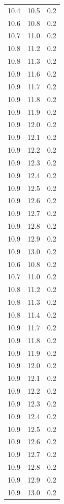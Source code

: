 \documentclass[usenatbib]{mn2e}
\begin{document}
\begin{table}
\begin{center}
\begin{tabular}{ccc}
10.4 & 10.5 & 0.2\\
10.6 & 10.8 & 0.2\\
10.7 & 11.0 & 0.2\\
10.8 & 11.2 & 0.2\\
10.8 & 11.3 & 0.2\\
10.9 & 11.6 & 0.2\\
10.9 & 11.7 & 0.2\\
10.9 & 11.8 & 0.2\\
10.9 & 11.9 & 0.2\\
10.9 & 12.0 & 0.2\\
10.9 & 12.1 & 0.2\\
10.9 & 12.2 & 0.2\\
10.9 & 12.3 & 0.2\\
10.9 & 12.4 & 0.2\\
10.9 & 12.5 & 0.2\\
10.9 & 12.6 & 0.2\\
10.9 & 12.7 & 0.2\\
10.9 & 12.8 & 0.2\\
10.9 & 12.9 & 0.2\\
10.9 & 13.0 & 0.2\\
10.6 & 10.8 & 0.2\\
10.7 & 11.0 & 0.2\\
10.8 & 11.2 & 0.2\\
10.8 & 11.3 & 0.2\\
10.8 & 11.4 & 0.2\\
10.9 & 11.7 & 0.2\\
10.9 & 11.8 & 0.2\\
10.9 & 11.9 & 0.2\\
10.9 & 12.0 & 0.2\\
10.9 & 12.1 & 0.2\\
10.9 & 12.2 & 0.2\\
10.9 & 12.3 & 0.2\\
10.9 & 12.4 & 0.2\\
10.9 & 12.5 & 0.2\\
10.9 & 12.6 & 0.2\\
10.9 & 12.7 & 0.2\\
10.9 & 12.8 & 0.2\\
10.9 & 12.9 & 0.2\\
10.9 & 13.0 & 0.2\\\hline\hline
\end{tabular}
\end{center}
\end{table}


 
\end{document}
